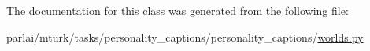 The documentation for this class was generated from the following file\+:\begin{DoxyCompactItemize}
\item 
parlai/mturk/tasks/personality\+\_\+captions/personality\+\_\+captions/\hyperlink{parlai_2mturk_2tasks_2personality__captions_2personality__captions_2worlds_8py}{worlds.\+py}\end{DoxyCompactItemize}
